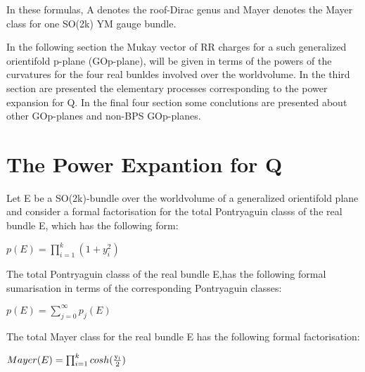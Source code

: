 \documentclass[a4paper,a4paper]{article}
\begin{document}
In these formulas, A denotes the roof-Dirac genus and Mayer denotes the Mayer class for one SO(2k) YM gauge bundle.

In the following section the Mukay vector of RR charges for a such generalized orientifold p-plane (GOp-plane), will be given in terms of the powers of the curvatures for the four real bunldes involved over the worldvolume.  In the third section are presented the elementary processes corresponding to the power expansion for Q. In the final four section some conclutions are presented about other GOp-planes and non-BPS GOp-planes.

\section{The Power Expantion for Q}

Let E be a SO(2k)-bundle over the worldvolume of a generalized orientifold plane and consider a formal factorisation for the total Pontryaguin classs of the real bundle E, which has the following form:

\begin{center}
{  $ p(E) = \prod_{i=1}^k(1+y_i^2)$ }
\end{center}
The total Pontryaguin classs of the real bundle E,has the following formal sumarisation in terms of the corresponding Pontryaguin classes: 
\begin{center}
{  $ p(E) = \sum_{j=0}^{\infty}p_j(E) $ }
\end{center}
The total Mayer class for the real bundle E has the following formal factorisation:
\begin{center}
{  $ Mayer(E) = \prod_{i=1}^kcosh(\frac{\rm y_i}{\rm 2})$ }
\end{center}
\end{document}
